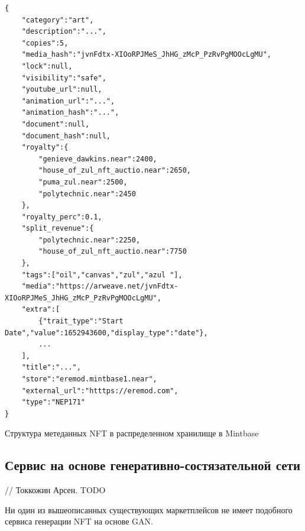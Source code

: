\begin{listing}
\begin{verbatim}
{
    "category":"art",
    "description":"...",
    "copies":5,
    "media_hash":"jvnFdtx-XIOoRPJMeS_JhHG_zMcP_PzRvPgMOOcLgMU",
    "lock":null,
    "visibility":"safe",
    "youtube_url":null,
    "animation_url":"...",
    "animation_hash":"...",
    "document":null,
    "document_hash":null,
    "royalty":{
        "genieve_dawkins.near":2400,
        "house_of_zul_nft_auctio.near":2650,
        "puma_zul.near":2500,
        "polytechnic.near":2450
    },
    "royalty_perc":0.1,
    "split_revenue":{
        "polytechnic.near":2250,
        "house_of_zul_nft_auctio.near":7750
    },
    "tags":["oil","canvas","zul","azul "],
    "media":"https://arweave.net/jvnFdtx-XIOoRPJMeS_JhHG_zMcP_PzRvPgMOOcLgMU",
    "extra":[
        {"trait_type":"Start Date","value":1652943600,"display_type":"date"},
        ...
    ],
    "title":"...",
    "store":"eremod.mintbase1.near",
    "external_url":"htttps://eremod.com",
    "type":"NEP171"
}

\end{verbatim}
\caption{Структура метеданных NFT в распределенном хранилище в Mintbase}
\label{lst.mintbase.nftstructmeta}
\end{listing}

\subsection{Сервис на основе генеративно-состязательной сети}
// Токкожин Арсен. TODO

Ни один из вышеописанных существующих маркетплейсов не имеет подобного сервиса генерации NFT на основе GAN.
